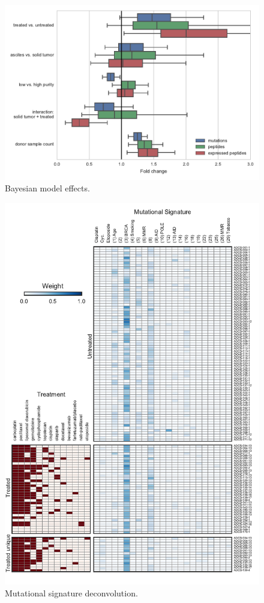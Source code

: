 \begin{figure}
\centering
\includegraphics[scale=1.0]{figures/bayesian_model_effects.pdf}
\caption{Bayesian model effects. }
\label{fig:bayesian}
\end{figure}

\begin{figure}
\centering
\includegraphics[scale=1.0]{figures/signatures.pdf}
\caption{Mutational signature deconvolution. }
\label{fig:signature}
\end{figure}


